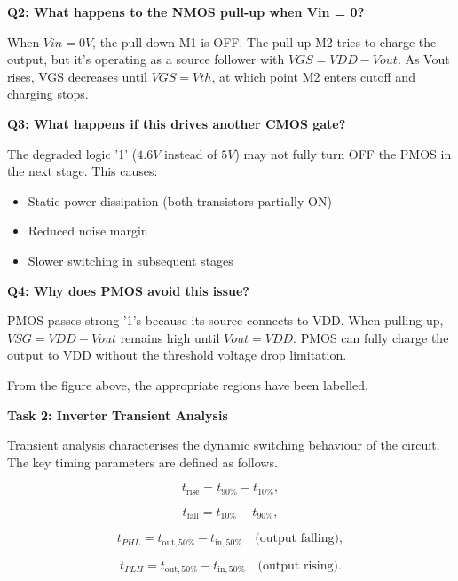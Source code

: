 \documentclass[a4paper,12pt]{article}
\begin{document}
\textbf{Q2: What happens to the NMOS pull-up when Vin = 0?}

When $Vin = 0V$, the pull-down M1 is OFF. The pull-up M2 tries to charge the output, but it's operating as a source follower with $VGS = VDD - Vout$. As Vout rises, VGS decreases until $VGS = Vth$, at which point M2 enters cutoff and charging stops.

\textbf{Q3: What happens if this drives another CMOS gate?}

The degraded logic '1' ($4.6V$ instead of $5V$) may not fully turn OFF the PMOS in the next stage. This causes:

\begin{itemize}
  \item Static power dissipation (both transistors partially ON)
  \item Reduced noise margin
  \item Slower switching in subsequent stages
\end{itemize}

\textbf{Q4: Why does PMOS avoid this issue?}

PMOS passes strong '1's because its source connects to VDD. When pulling up, $VSG = VDD - Vout$ remains high until $Vout = VDD$. PMOS can fully charge the output to VDD without the threshold voltage drop limitation.

From the figure above, the appropriate regions have been labelled.

\textbf{Task 2: Inverter Transient Analysis}

Transient analysis characterises the dynamic switching behaviour of the circuit. The key timing parameters are defined as follows.

\begin{equation}
t_{\text{rise}} = t_{90\%} - t_{10\%},
\end{equation}

\begin{equation}
t_{\text{fall}} = t_{10\%} - t_{90\%},
\end{equation}

\begin{equation}
t_{PHL} = t_{\text{out},50\%} - t_{\text{in},50\%} \quad \text{(output falling)},
\end{equation}

\begin{equation}
t_{PLH} = t_{\text{out},50\%} - t_{\text{in},50\%} \quad \text{(output rising)}.
\end{equation}
\end{document}
